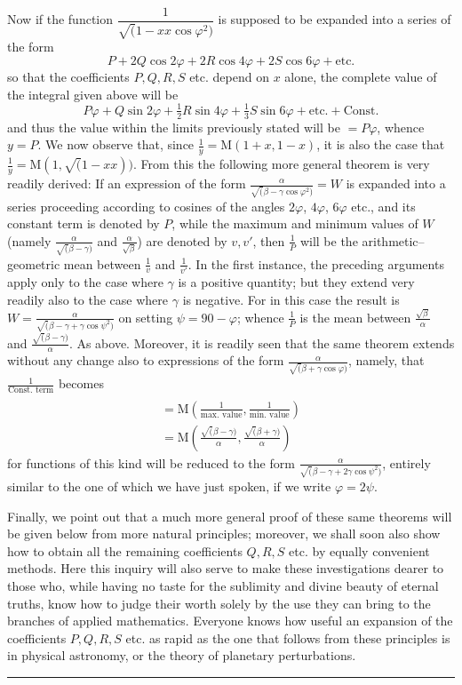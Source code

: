 Now if the function \(\dfrac1{\surd(1-xx\cos\varphi^2)}\) is supposed to be expanded into a series of the form
\[
P+2Q\cos2\varphi+2R\cos4\varphi+2S\cos6\varphi+\text{etc.}
\]
so that the coefficients \(P,Q,R,S\) etc. depend on \(x\) alone, the complete value
of the integral given above will be
\[
P\varphi+Q\sin2\varphi+\tfrac12R\sin4\varphi+\tfrac13S\sin6\varphi
+\text{etc.}+\text{Const.}
\]
and thus the value within the limits previously stated will be $=P\varphi$, whence $y=P$. We now observe
that, since $\frac{1}{y}=\mathrm{M}(1+x,1-x)$, it is also the case that
$\frac{1}{y}=\mathrm{M}(1,\surd(1-xx))$. From this the following more general theorem is very readily derived:
If an expression of the form
$\frac{\alpha}{\surd(\beta-\gamma\cos\varphi^{2})}=W$
is expanded into a series proceeding according to cosines of the angles $2\varphi$, $4\varphi$, $6\varphi$ etc.,
and its constant term is denoted by $P$, while the maximum
and minimum values of $W$ (namely $\frac{\alpha}{\surd(\beta-\gamma)}$ and
$\frac{\alpha}{\surd\beta}$) are denoted by $v,v'$, then $\frac{1}{P}$ will be the arithmetic–geometric mean between $\frac{1}{v}$ and $\frac{1}{v'}$. In the first instance,
the preceding arguments apply only to the case where $\gamma$ is a positive
quantity; but they extend very readily also to the case where $\gamma$ is negative.
For in this case the result is $W=\frac{\alpha}{\surd(\beta-\gamma+\gamma\cos\psi^{2})}$
on setting $\psi=90-\varphi$; whence $\frac{1}{P}$ is the mean between
$\frac{\surd\beta}{\alpha}$ and $\frac{\surd(\beta-\gamma)}{\alpha}$. As above.
Moreover, it is readily seen that the same theorem extends without any change also to expressions of the form $\frac{\alpha}{\surd(\beta+\gamma\cos\varphi)}$, namely, that
$\frac{1}{\text{Const. term}}$ becomes
\[
\begin{gathered}\\=\mathrm{M}\left(\frac{1}{\text{max. value}},\frac{1}{\text{min. value}}\right)\\=\mathrm{M}\left(\frac{\surd(\beta-\gamma)}{\alpha},
                 \frac{\surd(\beta+\gamma)}{\alpha}\right)\end{gathered}
\]
for functions of this kind will be reduced to the form
$\frac{\alpha}{\surd(\beta-\gamma+2\gamma\cos\psi^{2})}$, entirely similar to the one of which we have just spoken,
if we write $\varphi=2\psi$.

Finally, we point out that a much more general proof of these same theorems
will be given below from more natural principles; moreover, we shall soon also show how to obtain all
the remaining coefficients $Q,R,S$ etc. by equally convenient methods.
Here this inquiry will also serve to make these investigations dearer to those who,
while having no taste for the sublimity and divine beauty of eternal truths, know
how to judge their worth solely by the use they can bring to the branches of
applied mathematics. Everyone knows how useful
an expansion of the coefficients $P,Q,R,S$ etc. as rapid as the one that follows from these principles
is in physical astronomy, or the theory of planetary perturbations.


\par\begin{center}\rule{.15\linewidth}{.4pt}\end{center}
\clearpage
\endgroup
